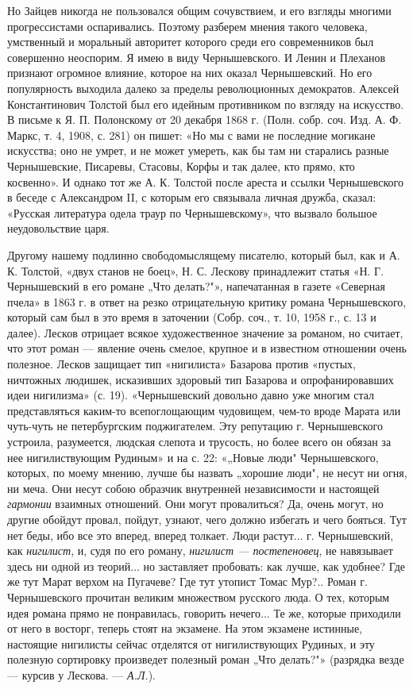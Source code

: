 Но Зайцев никогда не пользовался общим сочувствием, и его взгляды многими
прогрессистами оспаривались. Поэтому разберем мнения такого человека,
умственный и моральный авторитет которого среди его современников был
совершенно неоспорим. Я имею в виду Чернышевского. И Ленин и Плеханов признают
огромное влияние, которое на них оказал Чернышевский. Но его популярность
выходила далеко за пределы революционных демократов. Алексей Константинович
Толстой был его идейным противником по взгляду на искусство. В письме к Я. П.
Полонскому от 20 декабря 1868 г. (Полн. собр. соч. Изд. А. Ф. Маркс, т. 4,
1908, с. 281) он пишет: «Но мы с вами не последние
могикане искусства; оно не умрет, и не может умереть, как бы там ни старались
разные Чернышевские, Писаревы, Стасовы, Корфы и так далее, кто прямо, кто
косвенно». И однако тот же А. К. Толстой после ареста и ссылки Чернышевского в
беседе с Александром II, с которым его связывала личная дружба, сказал:
«Русская литература одела траур по Чернышевскому», что вызвало большое
неудовольствие царя.

Другому нашему подлинно свободомыслящему писателю, который был, как и
А. К. Толстой, «двух станов не боец», Н. С. Лескову принадлежит статья
«Н. Г. Чернышевский в его романе „Что делать?"», напечатанная в газете
«Северная пчела» в 1863 г. в ответ на резко отрицательную критику
романа Чернышевского, который сам был в это время в заточении (Собр.
соч., т. 10, 1958 г., с. 13 и далее). Лесков отрицает всякое
художественное значение за романом, но считает, что этот роман
--- явление очень смелое, крупное и в известном отношении очень
полезное. Лесков защищает тип «нигилиста» Базарова против «пустых,
ничтожных людишек, исказивших здоровый тип Базарова и опрофанировавших
идеи нигилизма» (с. 19). «Чернышевский довольно давно уже многим
стал представляться каким-то всепоглощающим чудовищем, чем-то вроде
Марата или чуть-чуть не петербургским поджигателем. Эту репутацию г.
Чернышевского устроила, разумеется, людская слепота и трусость, но
более всего он обязан за нее нигилиствующим Рудиным» и на с. 22:
«„Новые люди" Чернышевского, которых, по моему мнению, лучше бы
назвать „хорошие люди", не несут ни огня, ни меча. Они несут
собою образчик внутренней независимости и настоящей \emph{гармонии}
взаимных отношений. Они могут провалиться? Да, очень могут, но
другие обойдут провал, пойдут, узнают, чего должно избегать и чего
бояться. Тут нет беды, ибо все это вперед, вперед толкает. Люди
растут... г. Чернышевский, как \emph{нигилист}, и, судя по его роману,
\emph{нигилист --- постепеновец}, не навязывает здесь ни одной из
теорий... но заставляет пробовать: как лучше, как удобнее? Где же тут
Марат верхом на Пугачеве? Где тут утопист Томас Мур?.. Роман г.
Чернышевского прочитан великим множеством русского люда. О тех,
которым идея романа прямо не понравилась, говорить нечего... Те же,
которые приходили от него в восторг, теперь стоят на экзамене. На
этом экзамене истинные, настоящие нигилисты сейчас отделятся от
нигилиствующих Рудиных, и эту полезную сортировку произведет полезный
роман „Что делать?"» (разрядка везде --- курсив у Лескова. ---
\emph{А.Л.}).


